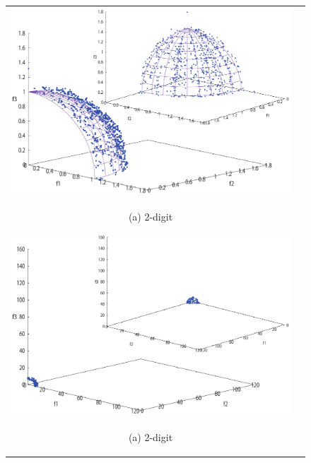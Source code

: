 \documentclass[../main/main]{subfiles}
\begin{document}
\begin{description}
\begin{figure}[htbp]
\begin{tabular}{cc}
\begin{minipage}{0.32\hsize}
\includegraphics[width=1\linewidth]{../figures/DTLZ2digi2_double.pdf}
\begin{center}
{\footnotesize (a) 2-digit}
\end{center}
\end{minipage}
\begin{minipage}{0.32\hsize}
\includegraphics[width=1\linewidth]{../figures/DTLZ3digi2_double.pdf}
\begin{center}
{\footnotesize (a) 2-digit}
\end{center}

\end{minipage}
\end{tabular}
\end{figure}
\end{description}
\end{document}
